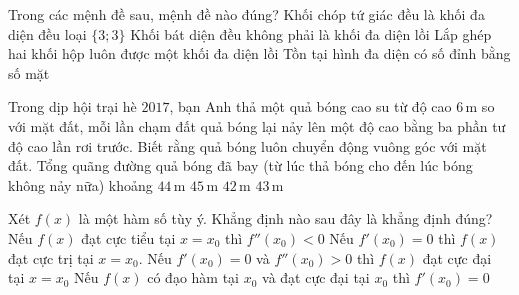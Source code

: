\begin{ex}%
Trong các mệnh đề sau, mệnh đề nào đúng?
\choice
{Khối chóp tứ giác đều là khối đa diện đều loại $\lbrace3;3\rbrace$}
{Khối bát diện đều không phải là khối đa diện lồi}
{Lắp ghép hai khối hộp luôn được một khối đa diện lồi}
{\True Tồn tại hình đa diện có số đỉnh bằng số mặt}
\end{ex}	
\begin{ex}%
Trong dịp hội trại hè $2017$, bạn Anh thả một quả bóng cao su từ độ cao $6\,\text{m}$ so với mặt đất, mỗi lần chạm đất quả bóng lại nảy lên một độ cao bằng ba phần tư độ cao lần rơi trước. Biết rằng quả bóng luôn chuyển động vuông góc với mặt đất. Tổng quãng đường quả bóng đã bay (từ lúc thả bóng cho đến lúc bóng không nảy nữa) khoảng
\choice
{$44\,\text{m}$}
{$45\,\text{m}$}
{\True $42\,\text{m}$}
{$43\,\text{m}$}
\end{ex}
\begin{ex}%
Xét $f\left( x \right)$ là một hàm số tùy ý. Khẳng định nào sau đây là khẳng định đúng?
\choice
{Nếu $f\left( x \right)$ đạt cực tiểu tại $x=x_0$ thì $f''\left( x_0 \right)<0$}
{Nếu $f'\left( {{x}_{0}} \right)=0$ thì $f\left( x \right)$ đạt cực trị tại $x={{x}_{0}}.$}
{Nếu $f'\left( x_0 \right)=0$ và $f''\left( x_0 \right)>0$ thì $f\left( x \right)$ đạt cực đại tại $x=x_0$}
{\True Nếu $f\left( x \right)$ có đạo hàm tại $x_0$ và đạt cực đại tại $x_0$ thì $f'\left( x_0 \right)=0$}
\end{ex}
